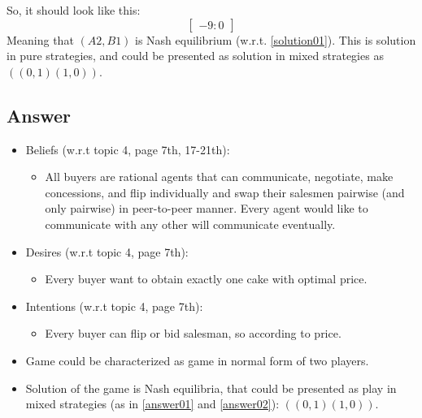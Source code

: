 \documentclass[
	a4paper, %
	11pt, %
]{CSUniSchoolLabReport}
\begin{document}
So, it should look like this:
$$
\begin{bmatrix}
    -9:0
\end{bmatrix}
$$
Meaning that $(A2, B1)$ is Nash equilibrium (w.r.t. \ref{solution01}). This is solution in pure strategies, and could be presented as solution in mixed strategies as $((0, 1)(1, 0))$.

\subsection{Answer}\label{answer03}
\begin{itemize}
    \item Beliefs (w.r.t topic 4, page 7th, 17-21th):
    \begin{itemize}
        \item All buyers are rational agents that can communicate, negotiate, make concessions, and flip individually and swap their salesmen pairwise (and only pairwise) in peer-to-peer manner. Every agent would like to communicate with any other will communicate eventually.
    \end{itemize}
    \item Desires (w.r.t topic 4, page 7th):
    \begin{itemize}
        \item Every buyer want to obtain exactly one cake with optimal price.
    \end{itemize}
    \item Intentions (w.r.t topic 4, page 7th):
    \begin{itemize}
        \item Every buyer can flip or bid salesman, so according to price.
    \end{itemize}
    \item Game could be characterized as game in normal form of two players.
    \item Solution of the game is Nash equilibria, that could be presented as play in mixed strategies (as in \ref{answer01} and \ref{answer02}): $((0, 1)(1, 0))$.
\end{itemize}

\end{document}
